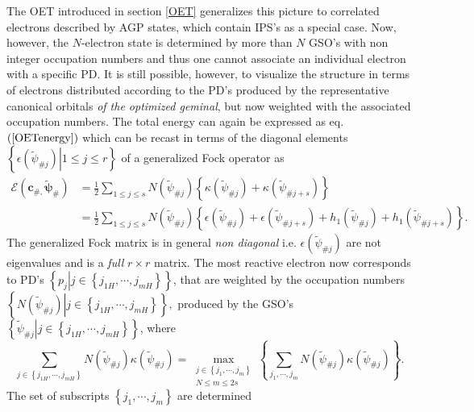 \documentclass[aps,preprint]{revtex4}%
\begin{document}
The OET introduced in section \ref{OET} generalizes this picture to correlated
electrons described by AGP states, which contain IPS's as a special case. Now,
however, the $N$-electron state is determined by more than $N$ GSO's with non
integer occupation numbers and thus one cannot associate an individual
electron with a specific PD. It is still possible, however, to visualize the
structure in terms of electrons distributed according to the PD's produced by
the representative canonical orbitals \emph{of the optimized geminal}, but now
weighted with the associated occupation numbers. The total energy can again be
expressed as eq. $\left(  \ref{OETenergy}\right)  $ which can be recast in
terms of the diagonal elements $\left\{  \left.  \epsilon\left(  \tilde{\psi
}_{\#j}\right)  \right\vert 1\leq j\leq r\right\}  $ of a generalized Fock
operator\emph{ }\cite{OrtizWeiner2006} as
\begin{align}
\mathcal{E}\left(  \boldsymbol{c}_{\#,}\boldsymbol{\tilde{\psi}}_{\#}\right)
&  =\frac{1}{2}\sum_{1\leq j\leq s}N\left(  \tilde{\psi}_{\#j}\right)
\left\{  \kappa\left(  \tilde{\psi}_{\#j}\right)  +\kappa\left(  \tilde{\psi
}_{\#j+s}\right)  \right\}  \nonumber\\
&  =\frac{1}{2}\sum_{1\leq j\leq s}N\left(  \tilde{\psi}_{\#j}\right)
\left\{  \epsilon\left(  \tilde{\psi}_{\#j}\right)  +\epsilon\left(
\tilde{\psi}_{\#j+s}\right)  +h_{1}\left(  \tilde{\psi}_{\#j}\right)
+h_{1}\left(  \tilde{\psi}_{\#j+s}\right)  \right\}  .\label{GenFocken}%
\end{align}
The generalized Fock matrix is in general \emph{non diagonal} i.e.
$\epsilon\left(  \tilde{\psi}_{\#j}\right)  $ are not eigenvalues and is a
\emph{full} $r\times r$ matrix. The most reactive electron now corresponds to
PD's $\left\{  \left.  p_{j}\right\vert j\in\left\{  j_{1H},\cdots
,j_{mH}\right\}  \right\}  $, that are weighted by the occupation numbers
$\left\{  \left.  N\left(  \tilde{\psi}_{\#j}\right)  \right\vert j\in\left\{
j_{1H},\cdots,j_{mH}\right\}  \right\}  ,$ produced by the GSO's $\left\{
\left.  \tilde{\psi}_{\#j}\right\vert j\in\left\{  j_{1H},\cdots
,j_{mH}\right\}  \right\}  $, where
\[
\sum_{j\in\left\{  j_{1H},\cdots,j_{mH}\right\}  }N\left(  \tilde{\psi}%
_{\#j}\right)  \kappa\left(  \tilde{\psi}_{\#j}\right)  =\max_{\substack{j\in
\left\{  j_{1},\cdots,j_{m}\right\}  \\N\leq m\leq2s}}\left\{  \sum
_{j_{1},\cdots,j_{m}}N\left(  \tilde{\psi}_{\#j}\right)  \kappa\left(
\tilde{\psi}_{\#j}\right)  \right\}  .
\]
The set of subscripts $\left\{  j_{1},\cdots,j_{m}\right\}  $ are determined
\end{document}
